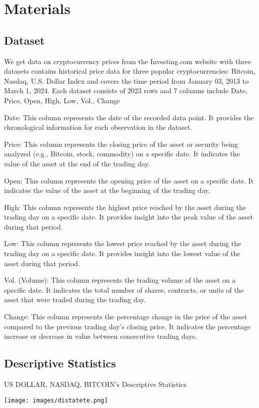 \documentclass{ieeeojies}
\begin{document}
\section{Materials}
\subsection{Dataset}
We get data on cryptocurrency prices from the Investing.com website with three datasets contains historical price data for three popular cryptocurrencies: Bitcoin, Nasdaq, U.S. Dollar Index and covers the time period from January 03, 2013 to March 1, 2024. Each dataset consists of 2023 rows and 7 columns include Date, Price, Open, High, Low, Vol., Change 

Date: This column represents the date of the recorded data point. It provides the chronological information for each observation in the dataset.

Price: This column represents the closing price of the asset or security being analyzed (e.g., Bitcoin, stock, commodity) on a specific date. It indicates the value of the asset at the end of the trading day.

Open: This column represents the opening price of the asset on a specific date. It indicates the value of the asset at the beginning of the trading day.

High: This column represents the highest price reached by the asset during the trading day on a specific date. It provides insight into the peak value of the asset during that period.

Low: This column represents the lowest price reached by the asset during the trading day on a specific date. It provides insight into the lowest value of the asset during that period.

Vol. (Volume): This column represents the trading volume of the asset on a specific date. It indicates the total number of shares, contracts, or units of the asset that were traded during the trading day.

Change: This column represents the percentage change in the price of the asset compared to the previous trading day's closing price. It indicates the percentage increase or decrease in value between consecutive trading days.
\subsection{Descriptive Statistics}
\begin{table}[H]
  \centering
  \caption{US DOLLAR, NASDAQ, BITCOIN’s Descriptive Statistics}
  \texttt{[image: images/distatete.png]}
  \label{fig:cm}
\end{table}
\end{document}
